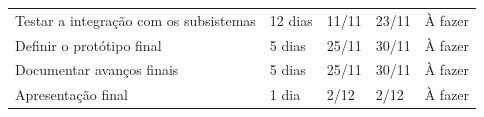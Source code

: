 \begin{table}[!htbp]
{\begin{tabular}{ l l l l l }
    \multicolumn{1}{|p{6.900cm}|}{Testar a integração com os subsistemas} &
    \multicolumn{1}{p{1.817cm}|}{12 dias} &
    \multicolumn{1}{p{1.650cm}|}{11/11} &
    \multicolumn{1}{p{1.550cm}|}{23/11} &
    \multicolumn{1}{p{2.000cm}|}{À fazer}
  \\  
  \cline{1-1}\cline{2-2}\cline{3-3}\cline{4-4}\cline{5-5}  
    \multicolumn{1}{|p{6.900cm}|}{Definir o protótipo final} &
    \multicolumn{1}{p{1.817cm}|}{5 dias} &
    \multicolumn{1}{p{1.650cm}|}{25/11} &
    \multicolumn{1}{p{1.550cm}|}{30/11} &
    \multicolumn{1}{p{2.000cm}|}{À fazer}
  \\  
  \cline{1-1}\cline{2-2}\cline{3-3}\cline{4-4}\cline{5-5}  
    \multicolumn{1}{|p{6.900cm}|}{Documentar avanços finais} &
    \multicolumn{1}{p{1.817cm}|}{5 dias} &
    \multicolumn{1}{p{1.650cm}|}{25/11} &
    \multicolumn{1}{p{1.550cm}|}{30/11} &
    \multicolumn{1}{p{2.000cm}|}{À fazer}
  \\  
  \cline{1-1}\cline{2-2}\cline{3-3}\cline{4-4}\cline{5-5}  
    \multicolumn{1}{|p{6.900cm}|}{Apresentação final} &
    \multicolumn{1}{p{1.817cm}|}{1 dia} &
    \multicolumn{1}{p{1.650cm}|}{2/12} &
    \multicolumn{1}{p{1.550cm}|}{2/12} &
    \multicolumn{1}{p{2.000cm}|}{À fazer}
  \\  
  \hline

 \end{tabular} }
\end{table}

			
\newpage


